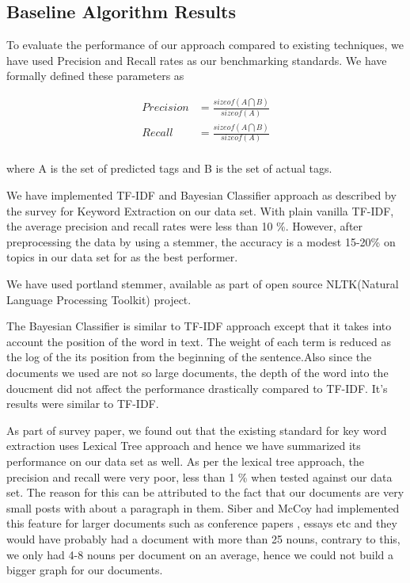 \documentclass[dvips,9pt]{article}
\begin{document}
		\subsection{Baseline Algorithm Results}
		
		
		To evaluate the performance of our approach compared to existing techniques, we have used Precision and Recall rates as our benchmarking standards.
		We have formally defined these parameters as 

		\begin{equation}
        \begin{aligned}
		Precision &= \frac{ sizeof(A \bigcap B)}{sizeof(A)} \\		
        Recall    &= \frac{ sizeof(A \bigcap B)}{sizeof(A)} \\
        \end{aligned}
        \end{equation}
            		
		where A is the set of predicted tags and B is the set of actual tags.
		
		We have implemented TF-IDF and Bayesian Classifier approach as described by the survey for Keyword Extraction on our data set. With plain vanilla TF-IDF, the average precision and recall rates were less than 10 \%. However, after preprocessing the data by using a stemmer, the accuracy is a modest 15-20\% on topics in our data set for as the best performer. 
		
		We have used portland stemmer, available as part of open source NLTK(Natural Language Processing Toolkit) project.
		
		The Bayesian Classifier is similar to TF-IDF approach except that it takes into account the position of the word in text. The weight of each term is reduced as the log of the its position from the beginning of the sentence.Also since the documents we used are not so large documents, the depth of the word into the doucment did not affect the performance drastically compared to TF-IDF. It's results were similar to TF-IDF. 
		
				
		As part of survey paper\cite{lott2012survey}, we found out that the existing standard for key word extraction uses Lexical Tree approach and hence we have summarized its performance on our data set as well. As per the lexical tree approach, the precision and recall were very poor, less than 1 \% when tested against our data set. The reason for this can be attributed to the fact that our documents are very small posts with about a paragraph in them. Siber and McCoy\cite{silber2002efficiently} had implemented this feature for larger documents such as conference papers , essays etc and they would have probably had a document with more than 25 nouns, contrary to this, we only had 4-8 nouns per document on an average, hence we could not build a bigger graph for our documents. 
		
\end{document}
